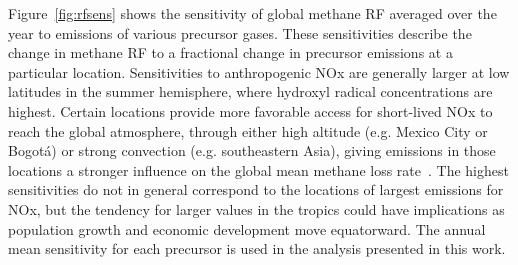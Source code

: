 Figure~\ref{fig:rfsens} shows the sensitivity of global methane RF averaged over the year to emissions of various precursor gases. These sensitivities describe the change in methane RF to a fractional change in precursor emissions at a particular location. Sensitivities to anthropogenic NOx are generally larger at low latitudes in the summer hemisphere, where hydroxyl radical concentrations are highest. Certain locations provide more favorable access for short-lived NOx to reach the global atmosphere, through either high altitude (e.g. Mexico City or Bogot\'a) or strong convection (e.g. southeastern Asia), giving emissions in those locations a stronger influence on the global mean methane loss rate~\citep{ref:bowman2012}. The highest sensitivities do not in general correspond to the locations of largest emissions for NOx, but the tendency for larger values in the tropics could have implications as population growth and economic development move equatorward. The annual mean sensitivity for each precursor is used in the analysis presented in this work.

